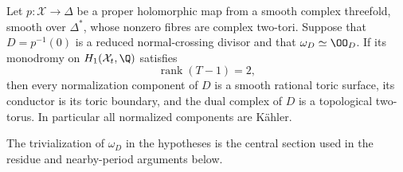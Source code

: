 \begin{proposition}\hypertarget{tag-030X}{}\label{push:src:B.4.28}

Let $p:\mathcal X\to\Delta$ be a proper holomorphic map
from a smooth complex threefold, smooth over $\Delta^*$,
whose nonzero fibres are complex two-tori. Suppose that
$D=p^{-1}(0)$ is a reduced normal-crossing divisor and that $\omega_D\simeq\OO_D$.
If its monodromy on $H_1(\mathcal X_t,\Q)$ satisfies
\begin{equation}
 \operatorname{rank}(T-1)=2,
\label{pub:I:eq:B-4-28-1}
\end{equation}
then every normalization component of $D$ is a smooth
rational toric surface, its conductor is its toric
boundary, and the dual complex of $D$ is a topological
two-torus. In particular all normalized components are
K\"ahler.

The trivialization of $\omega_D$ in the hypotheses is the central
section used in the residue and nearby-period arguments below.
\end{proposition}


